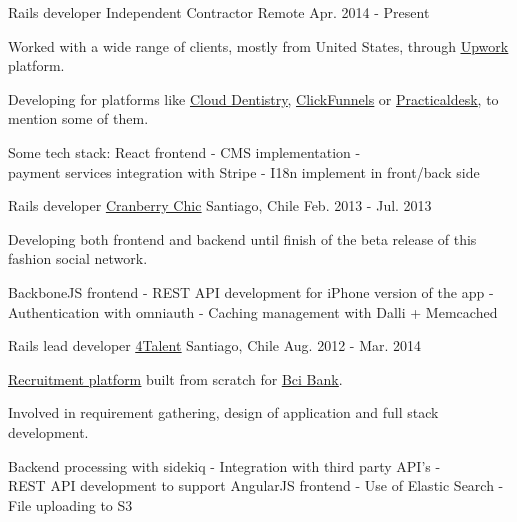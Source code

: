 \begin{cventries}
  \cventry
    {Rails developer} %
    {Independent Contractor} %
    {Remote} %
    {Apr. 2014 - Present} %
    {
      \begin{cvitems} %
        \item { Worked with a wide range of clients, mostly from United States, through
                \href{https://www.upwork.com/freelancers/~0165692cc0b947512e}{\underline{Upwork}} platform.}
        \item { Developing for platforms like
                \href{https://www.clouddentistry.com/}{\underline{Cloud Dentistry}},
                \href{https://www.clickfunnels.com/}{\underline{ClickFunnels}} or
                \href{https://practicaldesk.com/}{\underline{Practicaldesk}},
                to mention some of them.}
        \item { Some tech stack: React frontend - CMS implementation - \\
                payment services integration with Stripe - I18n implement in front/back side}
      \end{cvitems}
    }

  \cventry
    {Rails developer} %
    {\href{http://www.cranberrychic.com/}{\underline{Cranberry Chic}}} %
    {Santiago, Chile} %
    {Feb. 2013 - Jul. 2013} %
    {
      \begin{cvitems} %
        \item { Developing both frontend and backend until finish of the beta
                release of this fashion social network.}
        \item { BackboneJS frontend - REST API development for iPhone version of the app -\\
                Authentication with omniauth - Caching management with Dalli + Memcached }
      \end{cvitems}
    }

  \cventry
    {Rails lead developer} %
    {\href{http://4talent.cl/}{\underline{4Talent}}} %
    {Santiago, Chile} %
    {Aug. 2012 - Mar. 2014} %
    {
      \begin{cvitems} %
        \item { \href{http://trabajaenbci.cl/}{\underline{Recruitment platform}}
                built from scratch for \href{https://www.bci.cl/}{\underline{Bci Bank}}.}
        \item { Involved in requirement gathering, design of application and full stack development.}
        \item { Backend processing with sidekiq - Integration with third party API's -\\
                REST API development to support AngularJS frontend -
                Use of Elastic Search - File uploading to S3}
      \end{cvitems}
    }


\end{cventries}
